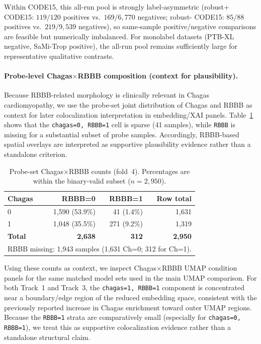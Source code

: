 Within CODE15, this all-run pool is strongly label-asymmetric (robust+ CODE15: \(119/120\) positives vs.\ \(169/6{,}770\) negatives; robust- CODE15: \(85/88\) positives vs.\ \(219/9{,}539\) negatives), so same-sample positive/negative comparisons are feasible but numerically imbalanced.
For monolabel datasets (PTB-XL negative, SaMi-Trop positive), the all-run pool remains sufficiently large for representative qualitative contrasts.

\paragraph{Probe-level Chagas$\times$RBBB composition (context for plausibility).}
Because RBBB-related morphology is clinically relevant in Chagas cardiomyopathy, we use the probe-set joint distribution of Chagas and RBBB as context for later colocalization interpretation in embedding/XAI panels.
Table~\ref{tab:probe_chagas_rbbb} shows that the \texttt{chagas=0, RBBB=1} cell is sparse (41 samples), while \texttt{RBBB} is missing for a substantial subset of probe samples.
Accordingly, RBBB-based spatial overlays are interpreted as supportive plausibility evidence rather than a standalone criterion.

\begin{table}[H]
  \centering
  \caption{Probe-set Chagas$\times$RBBB counts (fold~4). Percentages are within the binary-valid subset (\(n=2{,}950\)).}
  \label{tab:probe_chagas_rbbb}
  \begin{tabular}{lrrr}
    \toprule
    \textbf{Chagas} & \textbf{RBBB=0}  & \textbf{RBBB=1} & \textbf{Row total}       \\
    \midrule
    0               & 1{,}590 (53.9\%) & 41 (1.4\%)      & 1{,}631                  \\
    1               & 1{,}048 (35.5\%) & 271 (9.2\%)     & 1{,}319                  \\
    \midrule
    \textbf{Total}  & \textbf{2{,}638} & \textbf{312}    & \textbf{2{,}950}         \\
    \midrule
    \multicolumn{4}{l}{RBBB missing: 1{,}943 samples (1{,}631 Ch=0; 312 for Ch=1).} \\
    \bottomrule
  \end{tabular}
\end{table}

Using these counts as context, we inspect Chagas$\times$RBBB UMAP condition panels for the same matched model sets used in the main UMAP comparison.
For both Track~1 and Track~3, the \texttt{chagas=1, RBBB=1} component is concentrated near a boundary/edge region of the reduced embedding space, consistent with the previously reported increase in Chagas enrichment toward outer UMAP regions.
Because the \texttt{RBBB=1} strata are comparatively small (especially for \texttt{chagas=0, RBBB=1}), we treat this as supportive colocalization evidence rather than a standalone structural claim.

